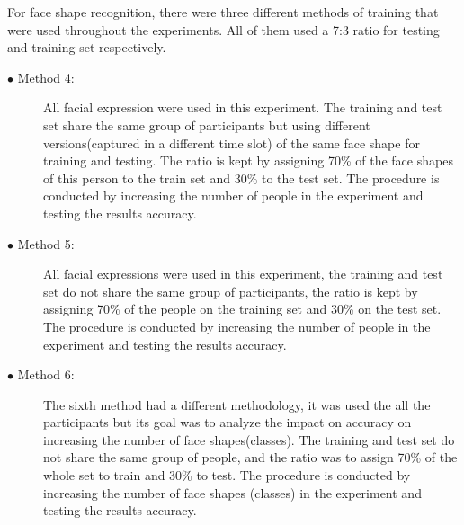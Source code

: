 \documentclass[]{article}
\begin{document}
For face shape recognition, there were three different methods of training that
were used throughout the experiments. All of them used a 7:3 ratio for testing 
and training set respectively.

\begin{description}
\item[$\bullet$ Method 4:] All facial expression were used in this experiment.
The training and test set share the same group of participants but using
different  versions(captured in a different time slot) of the same face shape
for training and testing. The ratio is kept by assigning 70\% of the face shapes
of this person to the train set and 30\% to the test set. The procedure is conducted
by increasing the number of people in the experiment and testing the results
accuracy.
\item[$\bullet$ Method 5:] All facial expressions were used in this experiment,
the training and test set do not  share the same group of participants, the
ratio is kept by assigning 70\% of the people on the training set and 30\% on the
test set. The procedure is conducted by increasing the number of people in the
experiment and testing the results accuracy.
\item[$\bullet$ Method 6:] The sixth method had a different methodology, it was
used the all the participants but its goal was to analyze the impact on accuracy
on increasing the number of face shapes(classes).  The training and test set do
not share the same group of people, and the ratio was to assign 70\% of the whole set to
train and 30\% to test. The procedure is conducted by increasing the number of
face shapes (classes) in the experiment and testing the results accuracy.
\end{description}
\end{document}
